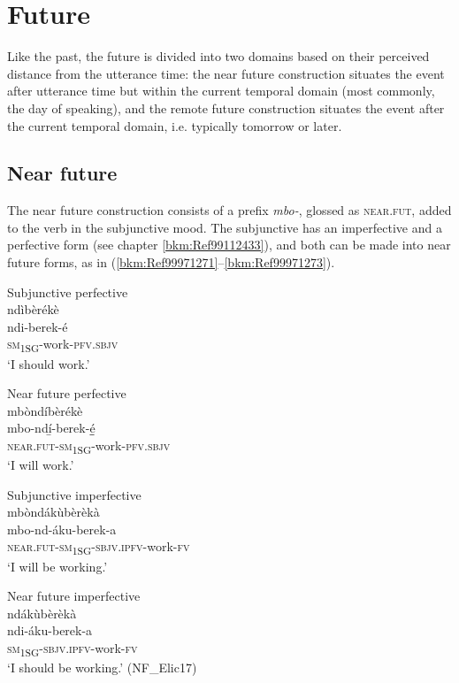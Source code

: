\section{Future}
\label{bkm:Ref463007186}\hypertarget{Toc75352685}{}
Like the past, the future is divided into two domains based on their perceived distance from the utterance time: the near future construction situates the event after utterance time but within the current temporal domain (most commonly, the day of speaking), and the remote future construction situates the event after the current temporal domain, i.e. typically tomorrow or later.

\subsection{Near future}
\label{bkm:Ref490749852}\label{bkm:Ref489880945}\label{bkm:Ref489268312}\hypertarget{Toc75352686}{}
The near future construction consists of a prefix \textit{mbo-}, glossed as \textsc{near}.\textsc{fut}, added to the verb in the subjunctive mood. The subjunctive has an imperfective and a perfective form (see chapter \ref{bkm:Ref99112433}), and both can be made into near future forms, as in (\ref{bkm:Ref99971271}--\ref{bkm:Ref99971273}).

\ea
\label{bkm:Ref99971271}
\ea
Subjunctive perfective \\
\glll ndìbèrékè\\
ndi-berek-é\\
\textsc{sm}\textsubscript{1SG}-work-\textsc{pfv}.\textsc{sbjv}\\  
\glt ‘I should work.’

\ex
Near future perfective\\
mbòndíbèrékè\\
\gll mbo-ndí̲-berek-é̲̲\\
\textsc{near}.\textsc{fut}-\textsc{sm}\textsubscript{1SG}-work-\textsc{pfv}.\textsc{sbjv}\\    
\glt ‘I will work.’          
\z\z

\ea
\label{bkm:Ref99971273}
\ea
Subjunctive imperfective\\
\glll mbòndákùbèrèkà        \\
mbo-nd-áku-berek-a \\
\textsc{near}.\textsc{fut}-\textsc{sm}\textsubscript{1SG}-\textsc{sbjv}.\textsc{ipfv}-work-\textsc{fv} \\
\glt ‘I will be working.’

\ex
Near future imperfective\\
\glll ndákùbèrèkà\\
ndi-áku-berek-a\\
\textsc{sm}\textsubscript{1SG}-\textsc{sbjv}.\textsc{ipfv}-work-\textsc{fv}  \\
\glt ‘I should be working.’ (NF\_Elic17)
\z\z

